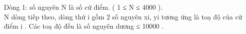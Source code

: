 Dòng 1: số nguyên N là số cứ điểm. ( 1 ≤ N ≤ 4000 ).   
\\   N dòng tiếp theo, dòng thứ i gồm 2 số nguyên xi, yi tương ứng là toạ độ của cứ điểm i . Các toạ độ đều là số nguyên dương ≤ 10000 .  

\